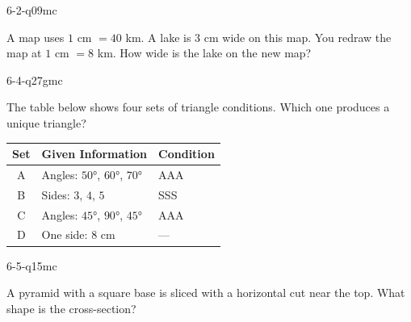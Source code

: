 \begin{practiceQuestion}{6-2-q09}{mc}
\begin{questionText}
A map uses $1$ cm $= 40$ km. A lake is $3$ cm wide on this map. You redraw the map at $1$ cm $= 8$ km. How wide is the lake on the new map?
\end{questionText}
\end{practiceQuestion}

\begin{practiceQuestion}{6-4-q27}{gmc}
\begin{questionText}
The table below shows four sets of triangle conditions. Which one produces a unique triangle?

\begin{center}
\begin{tabular}{|c|l|l|}
\hline
\textbf{Set} & \textbf{Given Information} & \textbf{Condition} \\
\hline
A & Angles: $50°$, $60°$, $70°$ & AAA \\
\hline
B & Sides: $3$, $4$, $5$ & SSS \\
\hline
C & Angles: $45°$, $90°$, $45°$ & AAA \\
\hline
D & One side: $8$ cm & --- \\
\hline
\end{tabular}
\end{center}
\end{questionText}
\end{practiceQuestion}

\begin{practiceQuestion}{6-5-q15}{mc}
\begin{questionText}
A pyramid with a square base is sliced with a horizontal cut near the top. What shape is the cross-section?
\end{questionText}
\end{practiceQuestion}

